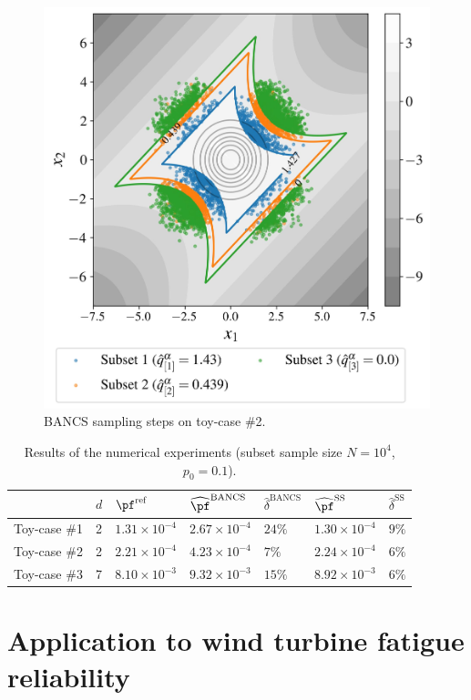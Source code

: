 \begin{figure}
    \centering
    \includegraphics[width=0.6\linewidth]{part3/figures/BANCS/bancs_4branch.jpg}
    \caption{BANCS sampling steps on toy-case \#2.}
    \label{fig:toycase2_reliability}
\end{figure}

\begin{table}[h]
    \centering
    \caption{Results of the numerical experiments (subset sample size $N=10^4$, $p_0=0.1$).}
    \begin{tabular}{|l|l|l||l|l||l|l|}\hline
     & $d$ & $\pf^{\mathrm{ref}}$ & $\widehat{\pf}^{\mathrm{BANCS}}$ & $\widehat{\delta}^{\mathrm{BANCS}}$ & $\widehat{\pf}^{\mathrm{SS}}$ & $\widehat{\delta}^{\mathrm{SS}}$\\
    \hline
    Toy-case \#1 & 2 & $1.31 \times 10^{-4}$ & $2.67 \times 10^{-4}$ & $24 \%$ & $1.30 \times 10^{-4}$ & $9 \%$\\
    \hline
    Toy-case \#2 & 2 & $2.21 \times 10^{-4}$ & $4.23 \times 10^{-4}$ & $7 \%$ & $2.24 \times 10^{-4}$ & $6 \%$\\
    \hline
    Toy-case \#3 & 7 & $8.10 \times 10^{-3}$ & $9.32 \times 10^{-3}$ & $15 \%$ & $8.92 \times 10^{-3}$ & $6 \%$\\ \hline
    \end{tabular}
    \label{tab:result_table}
\end{table}



\section{Application to wind turbine fatigue reliability}

